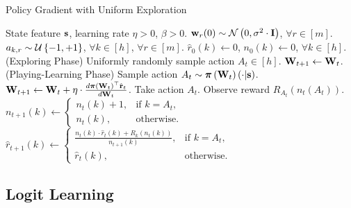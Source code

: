 \begin{algorithm}[t]
   \caption{Policy Gradient with Uniform Exploration}
\label{alg:policy_gradient_uniform_exploration}
\begin{algorithmic}
    State feature ${\mathbf{s}}$, learning rate $\eta > 0$, $\beta > 0$.
   \STATE ${\mathbf{w}}_r(0) \sim {\mathcal{N}}\left( 0, \sigma^2 \cdot {\mathbf{I}} \right)$, $\forall r \in [m]$.
   \STATE $a_{k, r} \sim {\mathcal{U}}\left\{-1, +1\right\}$, $\forall k \in [h]$, $\forall r \in [m]$.
   \STATE $\hat{r}_{0}\left(k\right) \gets 0$, $n_{0}\left(k\right) \gets 0$, $\forall k \in [h]$.
   \STATE (Exploring Phase)
   \STATE Uniformly randomly sample action $A_{t} \in [h]$.
   \STATE ${\mathbf{W}}_{t+1} \leftarrow {\mathbf{W}}_t$.
   \ELSE
   \STATE (Playing-Learning Phase)
   \STATE Sample action $A_{t} \sim {\boldsymbol{\pi}}\left({\mathbf{W}}_t\right)\left(\cdot \middle| {\mathbf{s}} \right)$.
   \STATE ${\mathbf{W}}_{t+1} \leftarrow {\mathbf{W}}_t + \eta \cdot \frac{d {\boldsymbol{\pi}}\left({\mathbf{W}}_t\right)^\top \hat{{\mathbf{r}}}_t}{d {\mathbf{W}}_t}$.
   \ENDIF
   \STATE Take action $A_{t}$. Observe reward $R_{ A_{t}}\left(n_{t}\left(A_t\right) \right)$.
   \STATE $n_{t+1}\left(k\right) \gets \left. 
		\begin{cases}
		n_{t}\left(k\right) + 1, & \text{if } k = A_t, \\
		n_{t}\left(k\right), & \text{otherwise}.
		\end{cases}
		\right.$
   \STATE $\hat{r}_{t+1}\left(k\right) \gets \left. 
		\begin{cases}
		\frac{n_{t}\left(k\right) \cdot \hat{r}_{t}\left(k\right) + R_{k}\left(n_{t}\left(k\right)\right) }{n_{t+1}\left(k\right)}, & \text{if } k = A_t, \\
		\hat{r}_{t}\left(k\right), & \text{otherwise}.
		\end{cases}
		\right.$
   \ENDFOR
\end{algorithmic}
\end{algorithm}

\subsection{Logit Learning}
\label{subsec:logit_learning}

